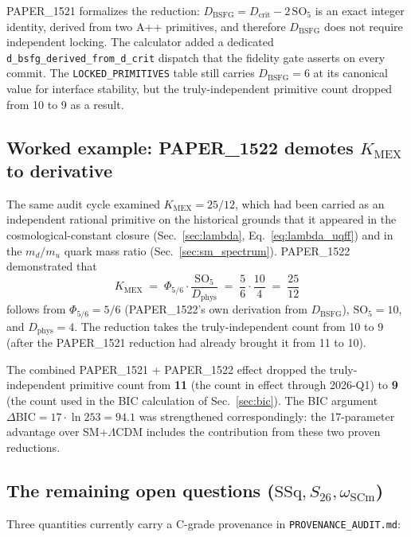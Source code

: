PAPER\_1521 \cite{Murphy_PAPER_1521} formalizes the reduction:
$D_{\text{BSFG}} = D_{\text{crit}} - 2\,\mathrm{SO}_5$ is an exact
integer identity, derived from two A++ primitives, and therefore
$D_{\text{BSFG}}$ does not require independent locking. The
calculator added a dedicated \texttt{d\_bsfg\_derived\_from\_d\_crit}
dispatch that the fidelity gate asserts on every commit. The
\texttt{LOCKED\_PRIMITIVES} table still carries $D_{\text{BSFG}} = 6$
at its canonical value for interface stability, but the
truly-independent primitive count dropped from 10 to 9 as a result.

\subsection{Worked example: PAPER\_1522 demotes $K_{\text{MEX}}$ to derivative}
\label{sec:paper_1522_worked}

The same audit cycle examined $K_{\text{MEX}} = 25/12$, which had
been carried as an independent rational primitive on the historical
grounds that it appeared in the cosmological-constant closure
(Sec.~\ref{sec:lambda}, Eq.~\ref{eq:lambda_uqff}) and in the
$m_d/m_u$ quark mass ratio (Sec.~\ref{sec:sm_spectrum}). PAPER\_1522
\cite{Murphy_PAPER_1522} demonstrated that
\[
K_{\text{MEX}} \;=\; \Phi_{5/6}\cdot\frac{\mathrm{SO}_5}{D_{\text{phys}}}
\;=\; \frac{5}{6}\cdot\frac{10}{4} \;=\; \frac{25}{12}
\]
follows from $\Phi_{5/6} = 5/6$ (PAPER\_1522's own derivation from
$D_{\text{BSFG}}$), $\mathrm{SO}_5 = 10$, and $D_{\text{phys}} = 4$.
The reduction takes the truly-independent count from 10 to 9 (after
the PAPER\_1521 reduction had already brought it from 11 to 10).

The combined PAPER\_1521 + PAPER\_1522 effect dropped the
truly-independent primitive count from \textbf{11} (the count in
effect through 2026-Q1) to \textbf{9} (the count used in the BIC
calculation of Sec.~\ref{sec:bic}). The BIC argument
$\Delta\mathrm{BIC} = 17 \cdot \ln 253 = 94.1$ was strengthened
correspondingly: the 17-parameter advantage over SM+$\Lambda$CDM
includes the contribution from these two proven reductions.

\subsection{The remaining open questions ($\mathrm{SSq}, S_{26}, \omega_{\text{SCm}}$)}
\label{sec:open_provenance}

Three quantities currently carry a C-grade provenance in
\texttt{PROVENANCE\_AUDIT.md}:

